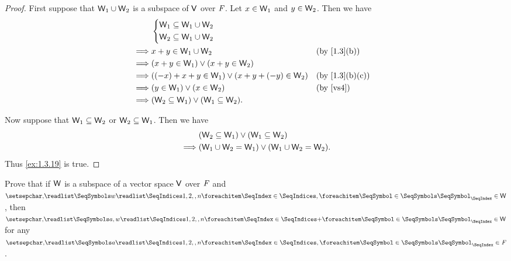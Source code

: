 \begin{proof}
	First suppose that \(\mathsf{W}_1 \cup \mathsf{W}_2\) is a subspace of \(\mathsf{V}\) over \(\mathit{F}\).
	Let \(x \in \mathsf{W}_1\) and \(y \in \mathsf{W}_2\).
	Then we have
	\begin{align*}
		         & \begin{dcases}
			\W_1 \subseteq \W_1 \cup \W_2 \\
			\W_2 \subseteq \W_1 \cup \W_2
		\end{dcases}                                                             \\
		\implies & x + y \in \W_1 \cup \W_2                             &  & \text{(by \cref{1.3}(b))}    \\
		\implies & (x + y \in \W_1) \lor (x + y \in \W_2)                                                 \\
		\implies & ((-x) + x + y \in \W_1) \lor (x + y + (-y) \in \W_2) &  & \text{(by \cref{1.3}(b)(c))} \\
		\implies & (y \in \W_1) \lor (x \in \W_2)                       &  & \text{(by \ref{vs4})}        \\
		\implies & (\W_2 \subseteq \W_1) \lor (\W_1 \subseteq \W_2).
	\end{align*}

	Now suppose that \(\mathsf{W}_1 \subseteq \mathsf{W}_2\) or \(\mathsf{W}_2 \subseteq \mathsf{W}_1\).
	Then we have
	\begin{align*}
		         & (\mathsf{W}_2 \subseteq \mathsf{W}_1) \lor (\mathsf{W}_1 \subseteq \mathsf{W}_2)      \\
		\implies & (\mathsf{W}_1 \cup \mathsf{W}_2 = \mathsf{W}_1) \lor (\mathsf{W}_1 \cup \mathsf{W}_2 = \mathsf{W}_2).
	\end{align*}
	Thus \cref{ex:1.3.19} is true.
\end{proof}

\begin{ex}\label{ex:1.3.20}
	Prove that if \(\mathsf{W}\) is a subspace of a vector space \(\mathsf{V}\) over \(\mathit{F}\) and \(\seq{w}{1,2,,n} \in \W\), then \(\seq[+]{a,w}{1,2,,n} \in \W\) for any \(\seq{a}{1,2,,n} \in \F\).
\end{ex}

